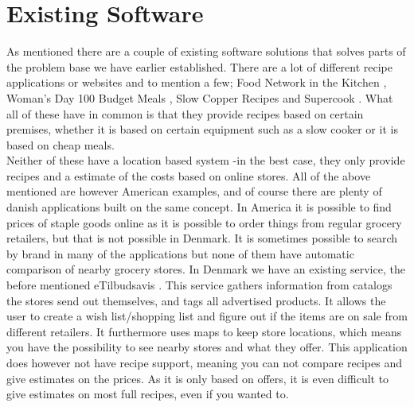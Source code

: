 \section{Existing Software}
\label{sec:exsoft}

As mentioned there are a couple of existing software solutions that solves parts of the problem base we have earlier established. There are a lot of different recipe applications or websites and to mention a few; Food Network in the Kitchen \cite{recipe_FN}, Woman's Day 100 Budget Meals \cite{recipe_woman}, Slow Copper Recipes \cite{recipe_SC} and Supercook \cite{recipe_supercook}. What all of these have in common is that they provide recipes based on certain premises, whether it is based on certain equipment such as a slow cooker or it is based on cheap meals. \\
Neither of these have a location based system -in the best case, they only provide recipes and a estimate of the costs based on online stores. All of the above mentioned are however American examples, and of course there are plenty of danish applications built on the same concept. In America it is possible to find prices of staple goods online as it is possible to order things from regular grocery retailers, but that is not possible in Denmark. It is sometimes possible to search by brand in many of the applications but none of them have automatic comparison of nearby grocery stores. In Denmark we have an existing service, the before mentioned eTilbudsavis \cite{etilbudsavis}. This service gathers information from catalogs the stores send out themselves, and tags all advertised products. It allows the user to create a wish list/shopping list and figure out if the items are on sale from different retailers. It furthermore uses maps to keep store locations, which means you have the possibility to see nearby stores and what they offer. This application does however not have recipe support, meaning you can not compare recipes and give estimates on the prices. As it is only based on offers, it is even difficult to give estimates on most full recipes, even if you wanted to.
